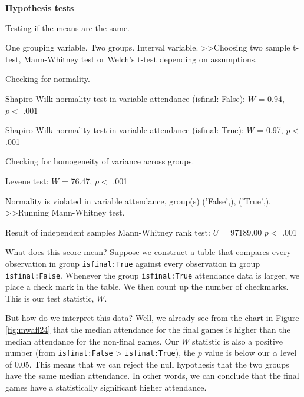 \documentclass[
  11pt,
  a4paper,
  twoside,symmetric,openright]{book}
\theoremstyle{break}
\theoremstyle{break}
\begin{document}
\begin{tcolorbox}[colback=white,
  colframe=lightgray,
  coltext=black,
  boxsep=4pt,
  boxrule=0.3pt,
  arc=0pt]
  {   \sffamily
      \color{CSblue}\textbf{Hypothesis tests}
      
      \color{CSgreen}Testing if the means are the same.
      
      One grouping variable. Two groups. Interval variable. \textgreater\textgreater  Choosing two sample t-test, Mann-Whitney test or Welch's t-test depending on assumptions.

      Checking for normality.

      \color{black}
      Shapiro-Wilk normality test in variable attendance (isfinal: False): $W$ = 0.94, $p <$ .001

      Shapiro-Wilk normality test in variable attendance (isfinal: True): $W$ = 0.97, $p <$ .001

      \color{CSgreen}
      Checking for homogeneity of variance across groups.

      \color{black}
      Levene test: $W$ = 76.47, $p <$ .001

      \color{CSgreen}
      Normality is violated in variable attendance, group(s) ('False',), ('True',). \textgreater\textgreater Running Mann-Whitney test.

      \color{black}
      Result of independent samples Mann-Whitney rank test: $U$ = 97189.00 $p <$ .001
      \normalfont
  }
\end{tcolorbox}

What does this score mean? Suppose we construct a table that compares every observation in group \texttt{isfinal:True} against every observation in group \texttt{isfinal:False}. Whenever the group \texttt{isfinal:True} attendance data is larger, we place a check mark in the table. We then count up the number of checkmarks. This is our test statistic, \(W\).

But how do we interpret this data? Well, we already see from the chart in Figure \ref{fig:mwafl24} that the median attendance for the final games is higher than the median attendance for the non-final games. Our \(W\) statistic is also a positive number (from \texttt{isfinal:False} \textgreater{} \texttt{isfinal:True}), the \(p\) value is below our \(\alpha\) level of 0.05. This means that we can reject the null hypothesis that the two groups have the same median attendance. In other words, we can conclude that the final games have a statistically significant higher attendance.
\end{document}
